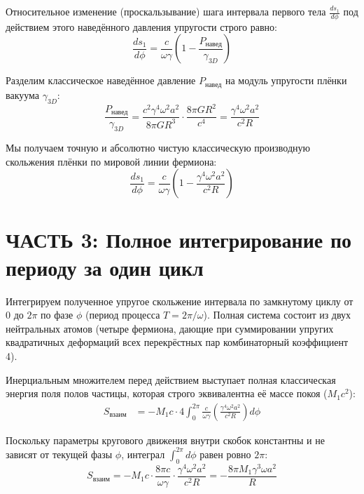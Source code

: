 \documentclass[12pt,a4paper]{article}
\begin{document}
Относительное изменение (проскальзывание) шага интервала первого тела $\frac{ds_1}{d\phi}$ под действием этого наведённого давления упругости строго равно:
\begin{equation}
\frac{ds_1}{d\phi} = \frac{c}{\omega \gamma} \left( 1 - \frac{P_{навед}}{\gamma_{3D}} \right)
\end{equation}

Разделим классическое наведённое давление $P_{навед}$ на модуль упругости плёнки вакуума $\gamma_{3D}$:
\begin{equation}
\frac{P_{навед}}{\gamma_{3D}} = \frac{c^2 \gamma^4 \omega^2 a^2}{8\pi G R^3} \cdot \frac{8\pi G R^2}{c^4} = \frac{\gamma^4 \omega^2 a^2}{c^2 R}
\end{equation}

Мы получаем точную и абсолютно чистую классическую производную скольжения плёнки по мировой линии фермиона:
\begin{equation}
\frac{ds_1}{d\phi} = \frac{c}{\omega \gamma} \left( 1 - \frac{\gamma^4 \omega^2 a^2}{c^2 R} \right)
\end{equation}

\section*{ЧАСТЬ 3: Полное интегрирование по периоду за один цикл}

Интегрируем полученное упругое скольжение интервала по замкнутому циклу от $0$ до $2\pi$ по фазе $\phi$ (период процесса $T = 2\pi/\omega$). Полная система состоит из двух нейтральных атомов (четыре фермиона, дающие при суммировании упругих квадратичных деформаций всех перекрёстных пар комбинаторный коэффициент 4).

Инерциальным множителем перед действием выступает полная классическая энергия поля полов частицы, которая строго эквивалентна её массе покоя ($M_1 c^2$):
\begin{align}
S_{взаим} &= - M_1 c \cdot 4 \int_0^{2\pi} \frac{c}{\omega \gamma} \left( \frac{\gamma^4 \omega^2 a^2}{c^2 R} \right) d\phi
\end{align}

Поскольку параметры кругового движения внутри скобок константны и не зависят от текущей фазы $\phi$, интеграл $\int_0^{2\pi} d\phi$ равен ровно $2\pi$:
\begin{equation}
S_{взаим} = - M_1 c \cdot \frac{8\pi c}{\omega \gamma} \cdot \frac{\gamma^4 \omega^2 a^2}{c^2 R} = - \frac{8\pi M_1 \gamma^3 \omega a^2}{R}
\end{equation}
\end{document}
